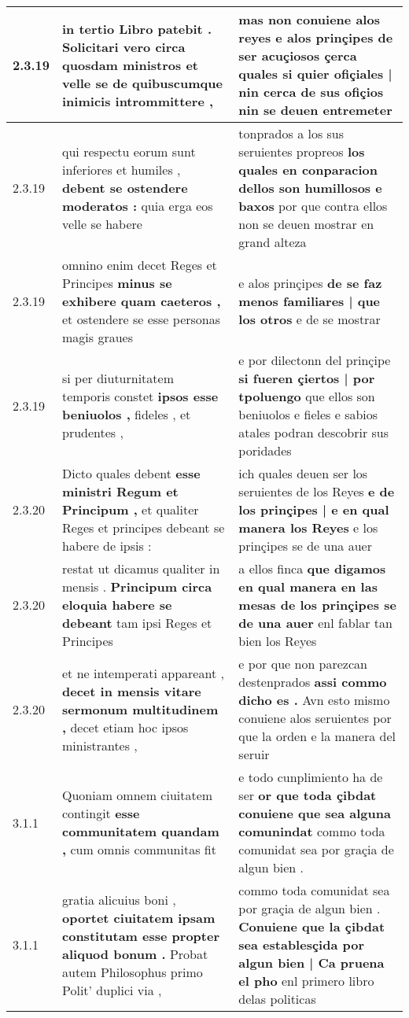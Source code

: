 \begin{tabular}{|p{1cm}|p{6.5cm}|p{6.5cm}|}
2.3.19 & in tertio Libro patebit . \textbf{ Solicitari vero circa quosdam ministros } et velle se de quibuscumque inimicis intrommittere , & mas non conuiene alos reyes e alos prinçipes de ser acuçiosos \textbf{ çerca quales si quier ofiçiales | nin cerca de sus ofiçios } nin se deuen entremeter \\\hline
2.3.19 & qui respectu eorum sunt inferiores et humiles , \textbf{ debent se ostendere moderatos : } quia erga eos velle se habere & tonprados a los sus seruientes propreos \textbf{ los quales en conparacion dellos son humillosos e baxos } por que contra ellos non se deuen mostrar en grand alteza \\\hline
2.3.19 & omnino enim decet Reges et Principes \textbf{ minus se exhibere quam caeteros , } et ostendere se esse personas magis graues & e alos prinçipes \textbf{ de se faz menos familiares | que los otros } e de se mostrar \\\hline
2.3.19 & si per diuturnitatem temporis constet \textbf{ ipsos esse beniuolos , } fideles , et prudentes , & e por dilectonn del prinçipe \textbf{ si fueren çiertos | por tpoluengo } que ellos son beniuolos e fieles e sabios atales podran descobrir sus poridades \\\hline
2.3.20 & Dicto quales debent \textbf{ esse ministri Regum et Principum , } et qualiter Reges et principes debeant se habere de ipsis : & ich quales deuen ser los seruientes de los Reyes \textbf{ e de los prinçipes | e en qual manera los Reyes } e los prinçipes se de una auer \\\hline
2.3.20 & restat ut dicamus qualiter in mensis . \textbf{ Principum circa eloquia habere se debeant } tam ipsi Reges et Principes & a ellos finca \textbf{ que digamos en qual manera en las mesas de los prinçipes se de una auer } enl fablar tan bien los Reyes \\\hline
2.3.20 & et ne intemperati appareant , \textbf{ decet in mensis vitare sermonum multitudinem , } decet etiam hoc ipsos ministrantes , & e por que non parezcan destenprados \textbf{ assi commo dicho es . } Avn esto mismo conuiene alos seruientes por que la orden e la manera del seruir \\\hline
3.1.1 & Quoniam omnem ciuitatem contingit \textbf{ esse communitatem quandam , } cum omnis communitas fit & e todo cunplimiento ha de ser \textbf{ or que toda çibdat conuiene que sea alguna comunindat } commo toda comunidat sea por graçia de algun bien . \\\hline
3.1.1 & gratia alicuius boni , \textbf{ oportet ciuitatem ipsam constitutam esse propter aliquod bonum . } Probat autem Philosophus primo Polit’ duplici via , & commo toda comunidat sea por graçia de algun bien . \textbf{ Conuiene que la çibdat sea establesçida por algun bien | Ca pruena el pho } enl primero libro delas politicas \\\hline

\end{tabular}
